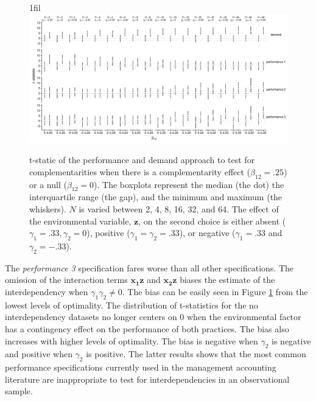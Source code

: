 \documentclass[12pt]{article}
\makeatletter
\newcommand*{\centerfloat}{%
  \parindent \z@
  \leftskip \z@ \@plus 1fil \@minus \textwidth
  \rightskip\leftskip
  \parfillskip \z@skip}
\makeatother
\begin{document}
\begin{figure}
\centerfloat
\includegraphics[width=600px]{figure-latex/main_plot.pdf}
\caption[Error Rate and Power of Demand and Performance Specification]
{\label{main} t-static of the performance and demand approach to test
for complementarities when there is a complementarity effect ($\beta_{12} = .25$)
or a null ($\beta_{12} = 0$). The boxplots represent the median (the dot) the
interquartile range (the gap), and the minimum and maximum (the whiskers). $N$
is varied between 2, 4, 8, 16, 32, and 64. The effect of the environmental
variable, $\mathbf{z}$, on the second choice is either absent 
($\gamma_1 = .33,  \gamma_2 = 0$), positive ($\gamma_1 = \gamma_2 = .33$), or negative ($\gamma_1 = .33$ and $\gamma_2 = -.33$).}
\end{figure}


The \emph{performance 3}  specification fares worse than all other specifications. The omission of the interaction terms \(\mathbf{x_1z}\) and \(\mathbf{x_2z}\) biases the estimate of the interdependency when $\gamma_1 \gamma_2 \neq 0$. The bias can be easily seen in Figure \ref{main} from the lowest levels of optimality. The distribution of t-statistics for the no interdependency datasets no longer centers on $0$ when the environmental factor has a contingency effect on the performance of both practices. The bias also increases with higher levels of optimality. The bias is negative when $\gamma_2$ is negative and positive when $\gamma_2$ is positive.  The latter results shows that the most common performance specifications currently used in the management accounting literature are inappropriate to test for interdependencies in an observational sample.


\end{document}
